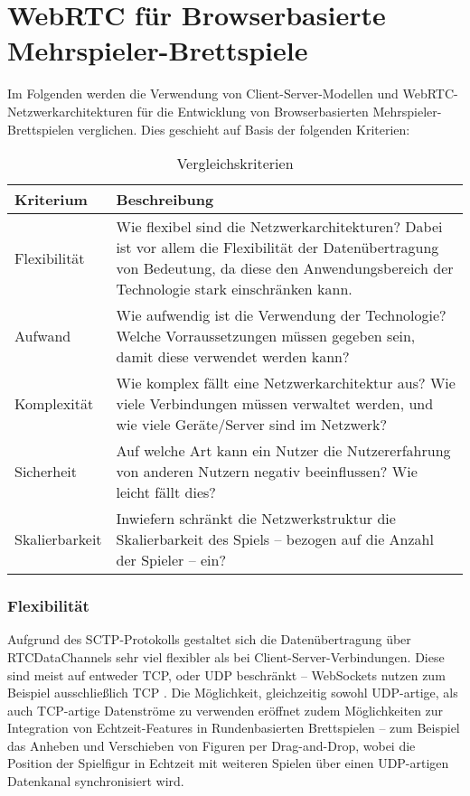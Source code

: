 \section{WebRTC für Browserbasierte Mehrspieler-Brettspiele}
Im Folgenden werden die Verwendung von Client-Server-Modellen und WebRTC-Netzwerkarchitekturen für die Entwicklung von Browserbasierten Mehrspieler-Brettspielen verglichen. Dies geschieht auf Basis der folgenden Kriterien:

\begin{table}[ht]
\centering
\begin{tabularx}{\textwidth}{lX}
\toprule
Kriterium&Beschreibung\\
\midrule
Flexibilität&Wie flexibel sind die Netzwerkarchitekturen? Dabei ist vor allem die Flexibilität der Datenübertragung von Bedeutung, da diese den Anwendungsbereich der Technologie stark einschränken kann.\\
Aufwand&Wie aufwendig ist die Verwendung der Technologie? Welche Vorraussetzungen müssen gegeben sein, damit diese verwendet werden kann?\\
Komplexität&Wie komplex fällt eine Netzwerkarchitektur aus? Wie viele Verbindungen müssen verwaltet werden, und wie viele Geräte/Server sind im Netzwerk?\\
Sicherheit&Auf welche Art kann ein Nutzer die Nutzererfahrung von anderen Nutzern negativ beeinflussen? Wie leicht fällt dies?\\
Skalierbarkeit&Inwiefern schränkt die Netzwerkstruktur die Skalierbarkeit des Spiels -- bezogen auf die Anzahl der Spieler -- ein?\\
\bottomrule

\end{tabularx}
\caption{Vergleichskriterien}
\label{table:idk}
\end{table}

\subsubsection{Flexibilität}
Aufgrund des \acs{SCTP}-Protokolls gestaltet sich die Datenübertragung über RTCDataChannels sehr viel flexibler als bei Client-Server-Verbindungen. Diese sind meist auf entweder \acs{TCP}, oder \acs{UDP} beschränkt -- WebSockets nutzen zum Beispiel ausschließlich \acs{TCP} \cite{websocketRFC}. Die Möglichkeit, gleichzeitig sowohl UDP-artige, als auch TCP-artige Datenströme zu verwenden eröffnet zudem Möglichkeiten zur Integration von Echtzeit-Features in Rundenbasierten Brettspielen -- zum Beispiel das Anheben und Verschieben von Figuren per Drag-and-Drop, wobei die Position der Spielfigur in Echtzeit mit weiteren Spielen über einen UDP-artigen Datenkanal synchronisiert wird.

